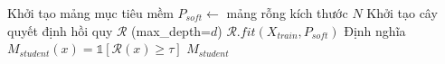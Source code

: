 \begin{algorithm}[!t]
\DontPrintSemicolon
\SetAlgoLined
{}
Khởi tạo mảng mục tiêu mềm $P_{soft} \leftarrow$ mảng rỗng kích thước $N$\;
Khởi tạo cây quyết định hồi quy $\mathcal{R}$ (max\_depth=$d$)\;
$\mathcal{R}.fit(X_{train}, P_{soft})$ 
Định nghĩa $M_{student}(x) = \mathbb{1}\!\left[\mathcal{R}(x) \geq \tau\right]$\;
\Return $M_{student}$ \;
\caption{Chưng cất tri thức nhãn mềm Giáo viên - Học sinh}
\label{algo:kd}
\end{algorithm}

